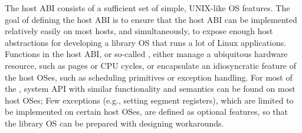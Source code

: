 \label{sec:abi:summary}



The host ABI consists of a sufficient set of simple, UNIX-like OS features.
The goal of defining the host ABI
is to ensure that the host ABI can be implemented relatively easily on most hosts,
and simultaneously, to expose enough host abstractions for developing a library OS that runs a lot of Linux applications.
Functions in the host ABI,
or so-called \hostapis{},
either manage a ubiquitous hardware resource, such as pages or CPU cycles,
or encapsulate an idiosyncratic feature of the host OSes, such as scheduling primitives or exception handling.
For most of the \hostapis{}, system API with similar functionality and semantics
can be found on most host OSes;
Few exceptions
(e.g., setting segment registers),
which are limited to be implemented on certain host OSes,
are defined as optional features,
so that the library OS can be prepared with designing workarounds.



